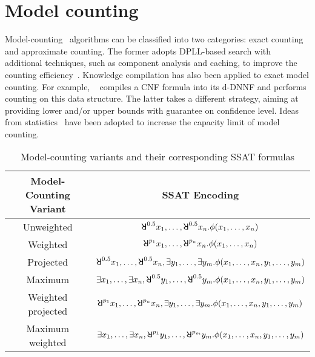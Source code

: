 \section{Model counting}
\label{sect:related-work-model-counting}

Model-counting~\cite{SATHandbook-ModelCounting} algorithms can be classified into two categories:
exact counting and approximate counting.
The former adopts DPLL-based search with additional techniques,
such as component analysis and caching, to improve the counting efficiency~\cite{Sang2004,Sang2005ModelCounting}.
Knowledge compilation has also been applied to exact model counting.
For example, \ctwod~\cite{Darwiche2001,Darwiche2002dDNNF} compiles a CNF formula into its d-DNNF and performs counting on this data structure.
The latter takes a different strategy,
aiming at providing lower and/or upper bounds with guarantee on confidence level.
Ideas from statistics~\cite{Chakraborty2013,Chakraborty2016} have been adopted to increase the capacity limit of model counting.

\begin{table}[t]
    \centering
    \caption{Model-counting variants and their corresponding SSAT formulas}
    \label{tbl:related-work-model-counting}
    \begin{tabular}{c|c}
        Model-Counting Variant & SSAT Encoding                                                                                              \\
        \hline
        Unweighted             & $\random{0.5}x_1,\ldots,\random{0.5}x_n.\pf(x_1,\ldots,x_n)$                                               \\
        Weighted               & $\random{p_1}x_1,\ldots,\random{p_n}x_n.\pf(x_1,\ldots,x_n)$                                               \\
        Projected              & $\random{0.5}x_1,\ldots,\random{0.5}x_n,\exists y_1,\ldots,\exists y_m.\pf(x_1,\ldots,x_n,y_1,\ldots,y_m)$ \\
        Maximum                & $\exists x_1,\ldots,\exists x_n,\random{0.5}y_1,\ldots,\random{0.5}y_m.\pf(x_1,\ldots,x_n,y_1,\ldots,y_m)$ \\
        Weighted projected     & $\random{p_1}x_1,\ldots,\random{p_n}x_n,\exists y_1,\ldots,\exists y_m.\pf(x_1,\ldots,x_n,y_1,\ldots,y_m)$ \\
        Maximum weighted       & $\exists x_1,\ldots,\exists x_n,\random{p_1}y_1,\ldots,\random{p_m}y_m.\pf(x_1,\ldots,x_n,y_1,\ldots,y_m)$ \\
    \end{tabular}
\end{table}

